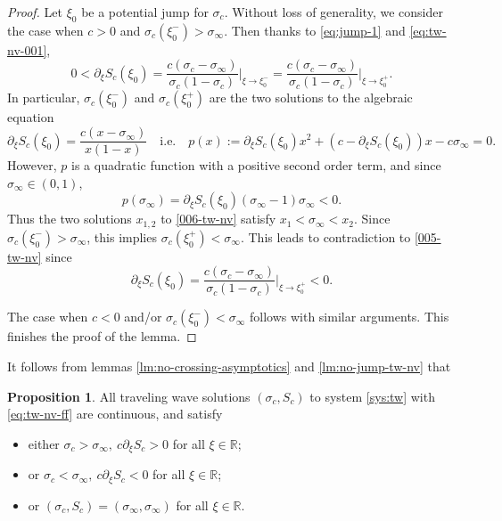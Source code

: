 \documentclass[12pt]{article}
\theoremstyle{definition}
\newtheorem{proposition}[theorem]{Proposition}
\theoremstyle{remark}
\numberwithin{equation}{section}
\begin{document}
\begin{proof}
Let $ \xi_0 $ be a potential jump for $ \sigma_c $.
Without loss of generality, we consider the case when $ c > 0 $ and $ \sigma_c(\xi_0^-) > \sigma_\infty $. Then thanks to \eqref{eq:jump-1} and \eqref{eq:tw-nv-001},
\begin{equation}
    \label{005-tw-nv}
    0< \partial_\xi S_c(\xi_0) = \frac{c(\sigma_c - \sigma_\infty)}{\sigma_c (1-\sigma_c)}\Big\vert_{\xi \rightarrow \xi_0^-} = \frac{c(\sigma_c - \sigma_\infty)}{\sigma_c (1-\sigma_c)}\Big\vert_{\xi \rightarrow \xi_0^+}.
\end{equation}
In particular, $ \sigma_c(\xi_0^-) $ and $ \sigma_c(\xi_0^+) $ are the two solutions to the algebraic equation
\begin{equation}
    \label{006-tw-nv}
    \partial_\xi S_c(\xi_0) = \frac{c(x-\sigma_\infty)}{x(1-x)} \quad \text{i.e.} \quad p(x):=\partial_\xi S_c(\xi_0) x^2 + (c-\partial_\xi S_c(\xi_0)) x - c\sigma_\infty = 0. 
\end{equation}
However, $ p $ is a quadratic function with a positive second order term, and since $ \sigma_\infty \in (0,1) $, 
\begin{equation}
    \label{007-tw-nv}
    p(\sigma_\infty) = \partial_\xi S_c(\xi_0) (\sigma_\infty - 1) \sigma_\infty < 0. 
\end{equation}
Thus the two solutions $ x_{1,2} $ to \eqref{006-tw-nv} satisfy $ x_1 < \sigma_\infty < x_2 $. Since $ \sigma_c(\xi_0^-) > \sigma_\infty $, this implies $ \sigma_c(\xi_0^+) < \sigma_\infty $. This leads to contradiction to \eqref{005-tw-nv} since 
\begin{equation}
    \partial_\xi S_c(\xi_0) = \frac{c(\sigma_c - \sigma_\infty)}{\sigma_c (1-\sigma_c)}\Big\vert_{\xi \rightarrow \xi_0^+} < 0.
\end{equation}

The case when $ c < 0 $ and/or $ \sigma_c(\xi_0^-) < \sigma_\infty $ follows with similar arguments. This finishes the proof of the lemma. 
\end{proof}

It follows from lemmas \ref{lm:no-crossing-asymptotics} and \ref{lm:no-jump-tw-nv} that
\begin{proposition}
    \label{prop:tw-nv-cnt}
    All traveling wave solutions $(\sigma_c, S_c)$ to system \eqref{sys:tw} with \eqref{eq:tw-nv-ff} are continuous, and satisfy 
    \begin{itemize}
        \item either $ \sigma_c > \sigma_\infty, \  c \partial_\xi S_c > 0 $ for all $ \xi \in \mathbb R $;
        \item or $ \sigma_c < \sigma_\infty, \  c \partial_\xi S_c < 0 $ for all $ \xi \in \mathbb R $;
        \item or $ (\sigma_c, S_c) = (\sigma_\infty, \sigma_\infty) $ for all $ \xi \in \mathbb R $. 
    \end{itemize}
\end{proposition}
\end{document}
